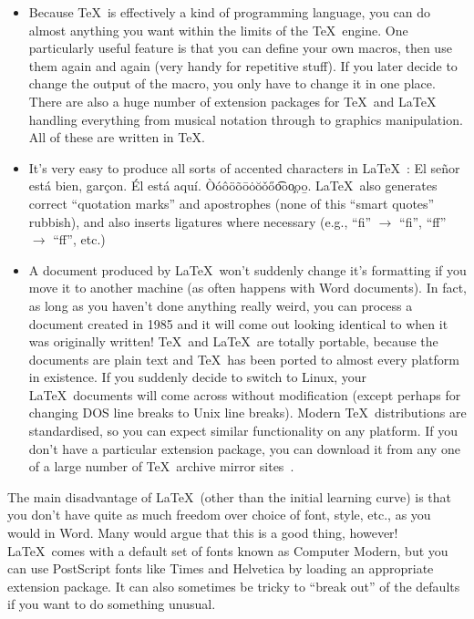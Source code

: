 \documentclass[12pt,a4paper,pdftex]{article}
\begin{document}
\begin{itemize}
	\item Because \TeX\ is effectively a kind of programming language, you can do almost anything you want within the limits of the \TeX\ engine. One particularly useful feature is that you can define your own macros, then use them again and again (very handy for repetitive stuff). If you later decide to change the output of the macro, you only have to change it in one place. There are also a huge number of extension packages for \TeX\ and \LaTeX\, handling everything from musical notation through to graphics manipulation. All of these are written in \TeX.
	
	\item It's very easy to produce all sorts of accented characters in \LaTeX~\cite{UsersGuide}: El se\~{n}or est\'{a} bien, gar\c{c}on. \'{E}l est\'{a} aqu\'{i}. \`{O}\'{o}\^{o}\"{o}\~{o}\={o}\.{o}\u{o}\v{o}\H{o}\t{oo}\c{o}\d{o}\b{o}. \LaTeX\ also generates correct ``quotation marks'' and apostrophes (none of this ``smart quotes'' rubbish), and also inserts ligatures where necessary (e.g., ``f{}i'' \(\rightarrow\) ``fi'', ``f{}f'' \(\rightarrow\) ``ff'', etc.)
	
	\item A document produced by \LaTeX\ won't suddenly change it's formatting if you move it to another machine (as often happens with Word documents). In fact, as long as you haven't done anything really weird, you can process a document created in 1985 and it will come out looking identical to when it was originally written! \TeX\ and \LaTeX\ are totally portable, because the documents are plain text and \TeX\ has been ported to almost every platform in existence. If you suddenly decide to switch to Linux, your \LaTeX\ documents will come across without modification (except perhaps for changing DOS line breaks to Unix line breaks). Modern \TeX\ distributions are standardised, so you can expect similar functionality on any platform. If you don't have a particular extension package, you can download it from any one of a large number of \TeX\ archive mirror sites~\cite{CTAN}.

\end{itemize}

The main disadvantage of \LaTeX\ (other than the initial learning curve) is that you don't have quite as much freedom over choice of font, style, etc., as you would in Word. Many would argue that this is a good thing, however! \LaTeX\ comes with a default set of fonts known as Computer Modern, but you can use PostScript fonts like {\selectfont Times} and {\selectfont Helvetica} by loading an appropriate extension package. It can also sometimes be tricky to ``break out'' of the defaults if you want to do something unusual.
\end{document}
